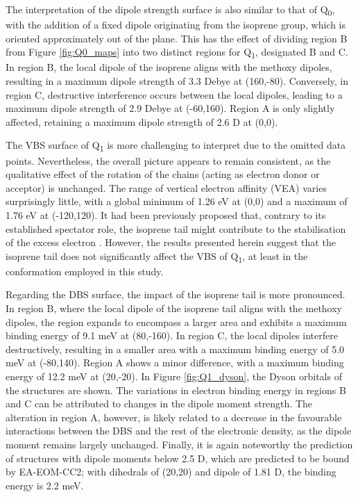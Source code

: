 The interpretation of the dipole strength surface is also similar to that of Q\textsubscript{0}, with the addition of a fixed dipole originating from the isoprene group, which is oriented approximately out of the plane. This has the effect of dividing region B from Figure \ref{fig:Q0_maps} into two distinct regions for Q\textsubscript{1}, designated B and C. In region B, the local dipole of the isoprene aligns with the methoxy dipoles, resulting in a maximum dipole strength of 3.3 Debye at (160,-80). Conversely, in region C, destructive interference occurs between the local dipoles, leading to a maximum dipole strength of 2.9 Debye at (-60,160). Region A is only slightly affected, retaining a maximum dipole strength of 2.6 D at (0,0).

The VBS surface of Q\textsubscript{1} is more challenging to interpret due to the omitted data points. Nevertheless, the overall picture appears to remain consistent, as the qualitative effect of the rotation of the chains (acting as electron donor or acceptor) is unchanged. The range of vertical electron affinity (VEA) varies surprisingly little, with a global minimum of 1.26 eV at (0,0) and a maximum of 1.76 eV at (-120,120). It had been previously proposed that, contrary to its established spectator role, the isoprene tail might contribute to the stabilisation of the excess electron \cite{pshenichnyuk2020ionizing}. However, the results presented herein suggest that the isoprene tail does not significantly affect the VBS of Q\textsubscript{1}, at least in the conformation employed in this study.

Regarding the DBS surface, the impact of the isoprene tail is more pronounced. In region B, where the local dipole of the isoprene tail aligns with the methoxy dipoles, the region expands to encompass a larger area and exhibits a maximum binding energy of 9.1 meV at (80,-160). In region C, the local dipoles interfere destructively, resulting in a smaller area with a maximum binding energy of 5.0 meV at (-80,140). Region A shows a minor difference, with a maximum binding energy of 12.2 meV at (20,-20). In Figure \ref{fig:Q1_dyson}, the Dyson orbitals of the structures are shown. The variations in electron binding energy in regions B and C can be attributed to changes in the dipole moment strength. The alteration in region A, however, is likely related to a decrease in the favourable interactions between the DBS and the rest of the electronic density, as the dipole moment remains largely unchanged. Finally, it is again noteworthy the prediction of structures with dipole moments below 2.5 D, which are predicted to be bound by EA-EOM-CC2; with dihedrals of (20,20) and dipole of 1.81 D, the binding energy is 2.2 meV.


